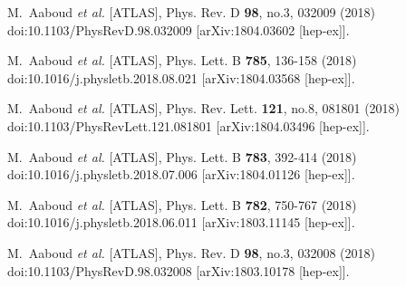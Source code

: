 \begin{thebibliography}{9}
M.~Aaboud \textit{et al.} [ATLAS],
Phys. Rev. D \textbf{98}, no.3, 032009 (2018)
doi:10.1103/PhysRevD.98.032009
[arXiv:1804.03602 [hep-ex]].

M.~Aaboud \textit{et al.} [ATLAS],
Phys. Lett. B \textbf{785}, 136-158 (2018)
doi:10.1016/j.physletb.2018.08.021
[arXiv:1804.03568 [hep-ex]].

M.~Aaboud \textit{et al.} [ATLAS],
Phys. Rev. Lett. \textbf{121}, no.8, 081801 (2018)
doi:10.1103/PhysRevLett.121.081801
[arXiv:1804.03496 [hep-ex]].

M.~Aaboud \textit{et al.} [ATLAS],
Phys. Lett. B \textbf{783}, 392-414 (2018)
doi:10.1016/j.physletb.2018.07.006
[arXiv:1804.01126 [hep-ex]].

M.~Aaboud \textit{et al.} [ATLAS],
Phys. Lett. B \textbf{782}, 750-767 (2018)
doi:10.1016/j.physletb.2018.06.011
[arXiv:1803.11145 [hep-ex]].

M.~Aaboud \textit{et al.} [ATLAS],
Phys. Rev. D \textbf{98}, no.3, 032008 (2018)
doi:10.1103/PhysRevD.98.032008
[arXiv:1803.10178 [hep-ex]].


\end{thebibliography}
